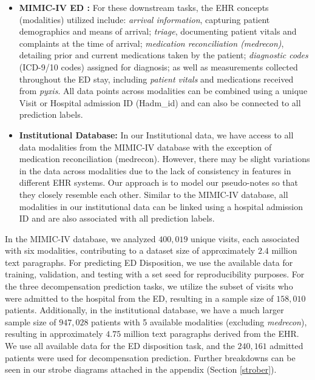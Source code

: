 \documentclass[pmlr]{jmlr}%
\begin{document}
\begin{itemize}
    \item \textbf{MIMIC-IV ED \citep{Johnson2023MIMICIVED}:} For these downstream tasks, the EHR concepts (modalities) utilized include: \textit{arrival information}, capturing patient demographics and means of arrival; \textit{triage}, documenting patient vitals and complaints at the time of arrival; \textit{medication reconciliation (medrecon)}, detailing prior and current medications taken by the patient; \textit{diagnostic codes} (ICD-9/10 codes) assigned for diagnosis; as well as measurements collected throughout the ED stay, including \textit{patient vitals} and medications received from \textit{pyxis}. All data points across modalities can be combined using a unique Visit or Hospital admission ID (Hadm\_id) and can also be connected to all prediction labels. 
    
    \item \textbf{Institutional Database:} 
    In our Institutional data, we have access to all data modalities from the MIMIC-IV database with the exception of medication reconciliation (medrecon). However, there may be slight variations in the data across modalities due to the lack of consistency in features in different EHR systems. Our approach is to model our pseudo-notes so that they closely resemble each other. Similar to the MIMIC-IV database, all modalities in our institutional data can be linked using a hospital admission ID and are also associated with all prediction labels.

\end{itemize}

In the MIMIC-IV database, we analyzed $400,019$ unique visits, each associated with six modalities, contributing to a dataset size of approximately $2.4$ million text paragraphs. For predicting ED Disposition, we use the available data for training, validation, and testing with a set seed for reproducibility purposes. For the three decompensation prediction tasks, we utilize the subset of visits who were admitted to the hospital from the ED, resulting in a sample size of $158,010$ patients. Additionally, in the institutional database, we have a much larger sample size of $947,028$ patients with 5 available modalities (excluding \textit{medrecon}), resulting in approximately $4.75$ million text paragraphs derived from the EHR. We use all available data for the ED disposition task, and the $240,161$ admitted patients were used for decompensation prediction. Further breakdowns can be seen in our strobe diagrams attached in the appendix (Section \ref{strober}).
\end{document}

